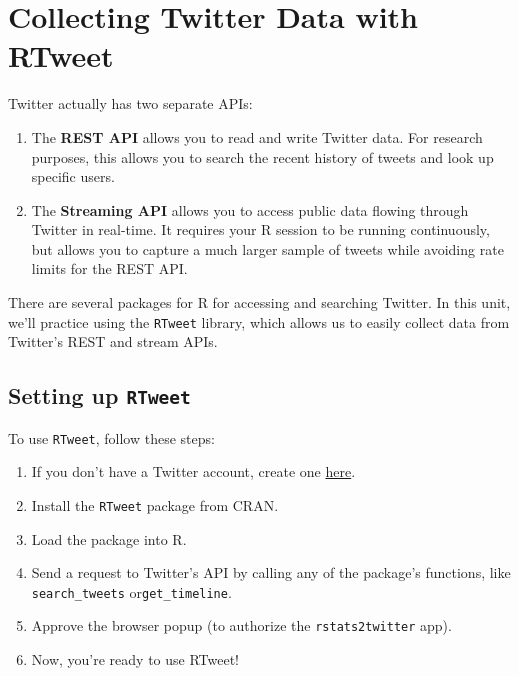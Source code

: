 \documentclass[]{book}
\providecommand{\tightlist}{%
  \setlength{\itemsep}{0pt}\setlength{\parskip}{0pt}}
\begin{document}
\hypertarget{collecting-twitter-data-with-rtweet}{%
\section{Collecting Twitter Data with RTweet}\label{collecting-twitter-data-with-rtweet}}

Twitter actually has two separate APIs:

\begin{enumerate}
\def\labelenumi{\arabic{enumi}.}
\tightlist
\item
  The \textbf{REST API} allows you to read and write Twitter data. For research purposes, this allows you to search the recent history of tweets and look up specific users.
\item
  The \textbf{Streaming API} allows you to access public data flowing through Twitter in real-time. It requires your R session to be running continuously, but allows you to capture a much larger sample of tweets while avoiding rate limits for the REST API.
\end{enumerate}

There are several packages for R for accessing and searching Twitter. In this unit, we'll practice using the \texttt{RTweet} library, which allows us to easily collect data from Twitter's REST and stream APIs.

\hypertarget{setting-up-rtweet}{%
\subsection{\texorpdfstring{Setting up \texttt{RTweet}}{Setting up RTweet}}\label{setting-up-rtweet}}

To use \texttt{RTweet}, follow these steps:

\begin{enumerate}
\def\labelenumi{\arabic{enumi}.}
\tightlist
\item
  If you don't have a Twitter account, create one \href{https://twitter.com/i/flow/signup}{here}.
\item
  Install the \texttt{RTweet} package from CRAN.
\item
  Load the package into R.
\item
  Send a request to Twitter's API by calling any of the package's functions, like \texttt{search\_tweets} or\texttt{get\_timeline}.
\item
  Approve the browser popup (to authorize the \texttt{rstats2twitter} app).
\item
  Now, you're ready to use RTweet!
\end{enumerate}
\end{document}
